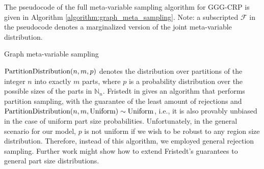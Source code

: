 The pseudocode of the full meta-variable sampling algorithm for GGG-CRP is given in Algorithm \ref{algorithm:graph_meta_sampling}. Note: a subscripted $\mathcal{F}$ in the pseudocode denotes a marginalized version of the joint meta-variable distribution.
\begin{algorithm}[H]
\caption{Graph meta-variable sampling}
\label{algorithm:graph_meta_sampling}
\begin{algorithmic}
\ENDFOR
{}
\end{algorithmic}
\end{algorithm} 

$\text{PartitionDistribution}\mathopen{}\left(n,m,p\right)$ denotes the distribution over partitions of the integer $n$ into exactly $m$ parts, where $p$ is a probability distribution over the possible sizes of the parts in $\mathbb{N}_{n}$. Fristedt in \cite{fristedt_structure_1993} gives an algorithm that performs partition sampling, with the guarantee of the least amount of rejections and $\text{PartitionDistribution}\mathopen{}\left(n,m,\text{Uniform}\right) \sim \text{Uniform}$, i.e., it is also provably unbiased in the case of uniform part size probabilities. Unfortunately, in the general scenario for our model, $p$ is not uniform if we wish to be robust to any region size distribution. Therefore, instead of this algorithm, we employed general rejection sampling. Further work might show how to extend Fristedt's guarantees to general part size distributions.
    
